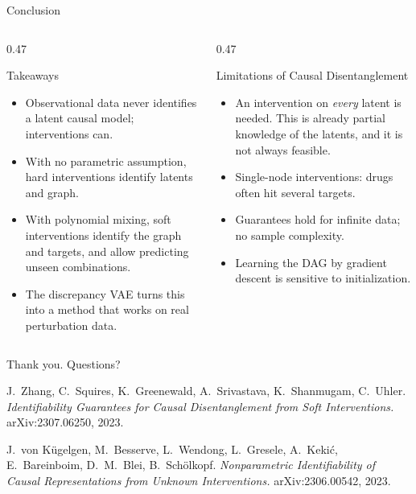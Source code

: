 \documentclass[11pt,aspectratio=169]{beamer}
\begin{document}
\begin{frame}{Conclusion}
	\begin{columns}[onlytextwidth,t]
		\begin{column}{0.47\textwidth}
			\begin{block}{Takeaways}
				\begin{itemize}
					\item Observational data never identifies a latent causal model; interventions can.
					\item With no parametric assumption, hard interventions identify latents and graph.
					\item With polynomial mixing, soft interventions identify the graph and targets, and allow predicting unseen combinations.
					\item The discrepancy VAE turns this into a method that works on real perturbation data.
				\end{itemize}
			\end{block}
		\end{column}
		\begin{column}{0.47\textwidth}
			\begin{block}{Limitations of Causal Disentanglement}
				\begin{itemize}
					\item An intervention on \emph{every} latent is needed. This is already partial knowledge of the latents, and it is not always feasible.
					\item Single-node interventions: drugs often hit several targets.
					\item Guarantees hold for infinite data; no sample complexity.
					\item Learning the DAG by gradient descent is sensitive to initialization.
				\end{itemize}
			\end{block}
		\end{column}
	\end{columns}
\end{frame}

\begin{closingframe}
	\vspace{15mm}
	{\Large Thank you. Questions?}

	\bigskip
	\footnotesize
	J.\ Zhang, C.\ Squires, K.\ Greenewald, A.\ Srivastava, K.\ Shanmugam, C.\ Uhler.
	\emph{Identifiability Guarantees for Causal Disentanglement from Soft Interventions.} arXiv:2307.06250, 2023.

	\medskip
	J.\ von K\"ugelgen, M.\ Besserve, L.\ Wendong, L.\ Gresele, A.\ Keki\'c, E.\ Bareinboim, D.\ M.\ Blei, B.\ Sch\"olkopf.
	\emph{Nonparametric Identifiability of Causal Representations from Unknown Interventions.} arXiv:2306.00542, 2023.
\end{closingframe}
\end{document}
